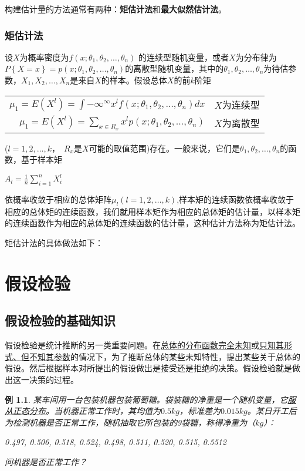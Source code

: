 \documentclass[11pt]{book}
\newcounter{#2}
\newcounter{#2}[#1]
\numberwithin{#2}{#1}
\newtheorem{math_example}{例}[section]
\newcommand{\inlinekeywords}[1]{\uline{#1}}
\begin{document}
	构建估计量的方法通常有两种：\textbf{矩估计法}和\textbf{最大似然估计法}。
	
	\subsection{矩估计法}
	设$X$为概率密度为$f(x;\theta_1,\theta_2,\dots,\theta_n)$ 的连续型随机变量，或者$X$为分布律为$P\left\lbrace X=x\right\rbrace =p(x;\theta_1,\theta_2,\dots,\theta_n)$的离散型随机变量，其中的$\theta_1,\theta_2,\dots,\theta_n$为待估参数，$X_1,X_2,\dots,X_n$是来自$X$的样本。假设总体$X$的前$k$阶矩
	\begin{center}
		\begin{tabular}{r l}
			$ \mu_1 = E(X^l) = \int{-\infty}^{\infty} x^l f(x;\theta_1,\theta_2,\dots,\theta_n) dx$ & $X$为连续型\\
			$ \mu_1 = E(X^l) = \sum\limits_{x \in R_x} x^l p(x;\theta_1,\theta_2,\dots,\theta_n)$  & $X$为离散型\\
		\end{tabular}
	\end{center}
	($l=1,2,\dots,k$，\ $R_x$是$X$可能的取值范围)存在。一般来说，它们是$\theta_1,\theta_2,\dots,\theta_n$的函数，基于样本矩
	\begin{center}
		$ A_l= \frac{1}{n}\sum\limits_{i=1}^n X_i^l $
	\end{center}
依概率收敛于相应的总体矩阵$\mu_l(l=1,2,\dots,k)$,样本矩的连续函数依概率收敛于相应的总体矩的连续函数，我们就用样本矩作为相应的总体矩的估计量，以样本矩的连续函数作为相应的总体矩的连续函数的估计量，这种估计方法称为矩估计法。

矩估计法的具体做法如下：






	\chapter{假设检验}
	\section{假设检验的基础知识}
	假设检验是统计推断的另一类重要问题。在\uline{总体的分布函数完全未知}或\uline{只知其形式、但不知其参数}的情况下，为了推断总体的某些未知特性，提出某些关于总体的假设。然后根据样本对所提出的假设做出是接受还是拒绝的决策。假设检验就是做出这一决策的过程。
	
	\begin{math_example}
		某车间用一台包装机器包装葡萄糖。袋装糖的净重是一个随机变量，它\inlinekeywords{服从正态分布}。当机器正常工作时，其均值为$ 0.5kg $，标准差为$ 0.015kg $。某日开工后为检测机器是否正常工作，随机抽取它所包装的9袋糖，称得净重为（$ kg $）：
		\begin{center}
			0.497, 0.506, 0.518, 0.524, 0.498, 0.511, 0.520, 0.515, 0.5512
		\end{center}		
		问机器是否正常工作？
	\end{math_example}
	
\end{document}
